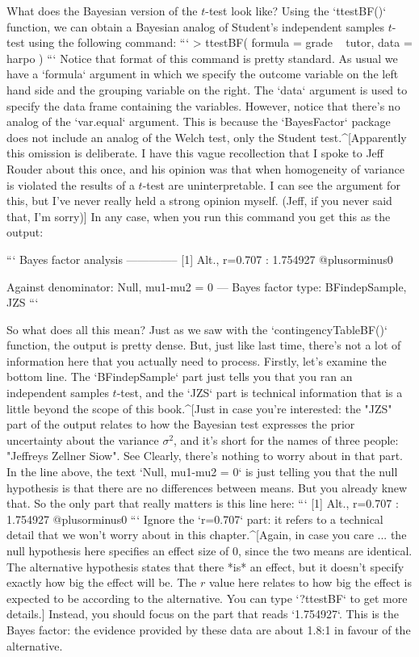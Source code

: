 What does the Bayesian version of the $t$-test look like? Using the `ttestBF()` function, we can obtain a Bayesian analog of Student's independent samples $t$-test using the following command:
```
> ttestBF( formula = grade ~ tutor, data = harpo )
```
Notice that format of this command is pretty standard. As usual we have a `formula` argument in which we specify the outcome variable on the left hand side and the grouping variable on the right. The `data` argument is used to specify the data frame containing the variables. However, notice that there's no analog of the `var.equal` argument. This is because the `BayesFactor` package does not include an analog of the Welch test, only the Student test.^[Apparently this omission is deliberate. I have this vague recollection that I spoke to Jeff Rouder about this once, and his opinion was that when homogeneity of variance is violated the results of a $t$-test are uninterpretable. I can see the argument for this, but I've never really held a strong opinion myself. (Jeff, if you never said that, I'm sorry)] In any case, when you run this command you get this as the output:

```
Bayes factor analysis
--------------
[1] Alt., r=0.707 : 1.754927 @plusorminus0%

Against denominator:
  Null, mu1-mu2 = 0 
---
Bayes factor type: BFindepSample, JZS
```


So what does all this mean? Just as we saw with the `contingencyTableBF()` function, the output is pretty dense. But, just like last time, there's not a lot of information here that you actually need to process. Firstly, let's examine the bottom line. The `BFindepSample` part just tells you that you ran an independent samples $t$-test, and the `JZS` part is technical information that is a little beyond the scope of this book.^[Just in case you're interested: the "JZS" part of the output relates to how the Bayesian test expresses the prior uncertainty about the variance $\sigma^2$, and it's short for the names of three people: "Jeffreys Zellner Siow". See \citeA{Rouder2009] for details.} Clearly, there's nothing to worry about in that part. In the line above, the text `Null, mu1-mu2 = 0` is just telling you that the null hypothesis is that there are no differences between means. But you already knew that. So the only part that really matters is this line here:
```
[1] Alt., r=0.707 : 1.754927 @plusorminus0%
```
Ignore the `r=0.707` part: it refers to a technical detail that we won't worry about in this chapter.^[Again, in case you care ... the null hypothesis here specifies an effect size of 0, since the two means are identical. The alternative hypothesis states that there *is* an effect, but it doesn't specify exactly how big the effect will be. The $r$ value here relates to how big the effect is expected to be according to the alternative. You can type `?ttestBF` to get more details.] Instead, you should focus on the part that reads `1.754927`. This is the Bayes factor: the evidence provided by these data are about 1.8:1 in favour of the alternative. 

